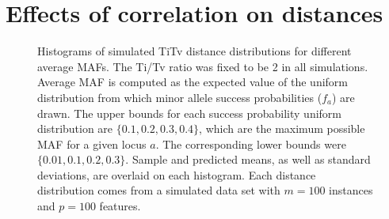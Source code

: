 \documentclass[10pt,letterpaper]{article}\usepackage[]{graphicx}\usepackage[]{color}
\begin{document}
\section{Effects of correlation on distances}



\begin{figure}[H]
	\centering
	\caption{Histograms of simulated TiTv distance distributions for different average MAFs. The Ti/Tv ratio was fixed to be 2 in all simulations. Average MAF is computed as the expected value of the uniform distribution from which minor allele success probabilities ($f_a$) are drawn. The upper bounds for each success probability uniform distribution are $\{0.1,0.2,0.3,0.4\}$, which are the maximum possible MAF for a given locus $a$. The corresponding lower bounds were $\{0.01,0.1,0.2,0.3\}$. Sample and predicted means, as well as standard deviations, are overlaid on each histogram. Each distance distribution comes from a simulated data set with $m=100$ instances and $p=100$ features.}\label{fig:TiTv_hist}
\end{figure}
\end{document}
